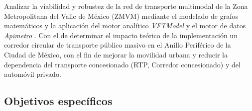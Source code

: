 Analizar la viabilidad y robustez de la red de transporte multimodal de la Zona Metropolitana
del Valle de México (ZMVM) mediante el modelado de grafos matemáticos y la aplicación del motor
analítico \textit{VFTModel} \textcite{cabrera2026VFTModel} y 
el motor de datos \textit{Apimetro} \textcite{cabrera2025apimetro}. Con el \DIFdelbegin {}\DIFdelend \DIFaddbegin {}\DIFaddend de determinar el impacto teórico de
la implementación \DIFaddbegin {}\DIFaddend un corredor circular de transporte público masivo en el Anillo Periférico de 
la Ciudad de México, con el fin de mejorar la movilidad urbana y reducir la dependencia del transporte
concesionado (RTP, Corredor concesionado) y del automóvil privado.

\subsection{Objetivos específicos}
\label{subsec:obj-especificos}

